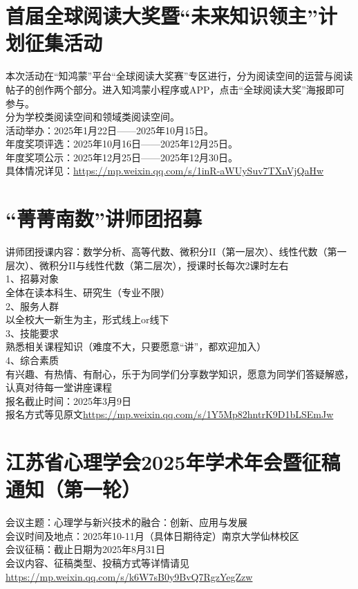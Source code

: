 \documentclass[letterpaper, 12pt]{article}
\begin{document}
\begin{multicols}{2}
\section{首届全球阅读大奖暨“未来知识领主”计划征集活动}
本次活动在“知鸿蒙”平台“全球阅读大奖赛”专区进行，分为阅读空间的运营与阅读帖子的创作两个部分。进入知鸿蒙小程序或APP，点击“全球阅读大奖”海报即可参与。\\
分为学校类阅读空间和领域类阅读空间。\\
活动举办：2025年1月22日——2025年10月15日。\\
年度奖项评选：2025年10月16日——2025年12月25日。\\
年度奖项公示：2025年12月25日——2025年12月30日。\\
具体情况详见：\url{https://mp.weixin.qq.com/s/1inR-aWUySuv7TXnVjQaHw}

\section{“菁菁南数”讲师团招募}
讲师团授课内容：数学分析、高等代数、微积分II（第一层次）、线性代数（第一层次）、微积分II与线性代数（第二层次），授课时长每次2课时左右\\
1、招募对象\\
全体在读本科生、研究生（专业不限）\\
2、服务人群\\
以全校大一新生为主，形式线上or线下\\
3、技能要求\\
熟悉相关课程知识（难度不大，只要愿意“讲”，都欢迎加入）\\
4、综合素质\\
有兴趣、有热情、有耐心，乐于为同学们分享数学知识，愿意为同学们答疑解惑，认真对待每一堂讲座课程\\
报名截止时间：2025年3月9日\\
报名方式等见原文\url{https://mp.weixin.qq.com/s/1Y5Mp82hntrK9D1bLSEmJw}\\

\section{江苏省心理学会2025年学术年会暨征稿通知（第一轮）}
会议主题：心理学与新兴技术的融合：创新、应用与发展\\会议时间及地点：2025年10-11月（具体日期待定）南京大学仙林校区\\会议征稿：截止日期为2025年8月31日\\会议内容、征稿类型、投稿方式等详情请见\url{https://mp.weixin.qq.com/s/k6W7sB0y9BvQ7RgzYegZzw}\\


\end{multicols}
\end{document}
